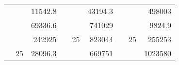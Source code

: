 \begin{table}[H]
\begin{tabular}{|ccrccrccc}
\rowcolor[HTML]{DAE8FC} 
\multicolumn{1}{|c|}{\cellcolor[HTML]{FFFFC7}}                                & \multicolumn{1}{c|}{\cellcolor[HTML]{DAE8FC}}                      & \multicolumn{1}{r|}{\cellcolor[HTML]{DAE8FC}11542.8}   & \multicolumn{1}{c|}{\cellcolor[HTML]{FFFFC7}}                                & \multicolumn{1}{c|}{\cellcolor[HTML]{DAE8FC}}                       & \multicolumn{1}{r|}{\cellcolor[HTML]{DAE8FC}43194.3}   & \multicolumn{1}{c|}{\cellcolor[HTML]{FFFFC7}}                                & \multicolumn{1}{c|}{\cellcolor[HTML]{DAE8FC}}                      & \multicolumn{1}{r|}{\cellcolor[HTML]{DAE8FC}498003}    \\ \cline{3-3} \cline{6-6} \cline{9-9} 
\multicolumn{1}{|c|}{\cellcolor[HTML]{FFFFC7}}                                & \multicolumn{1}{c|}{\cellcolor[HTML]{DAE8FC}}                      & \multicolumn{1}{r|}{\cellcolor[HTML]{DDFDFF}69336.6}   & \multicolumn{1}{c|}{\cellcolor[HTML]{FFFFC7}}                                & \multicolumn{1}{c|}{\cellcolor[HTML]{DAE8FC}}                       & \multicolumn{1}{r|}{\cellcolor[HTML]{DDFDFF}741029}    & \multicolumn{1}{c|}{\cellcolor[HTML]{FFFFC7}}                                & \multicolumn{1}{c|}{\cellcolor[HTML]{DAE8FC}}                      & \multicolumn{1}{r|}{\cellcolor[HTML]{DDFDFF}9824.9}    \\ \cline{3-3} \cline{6-6} \cline{9-9} 
\rowcolor[HTML]{DAE8FC} 
\multicolumn{1}{|c|}{\cellcolor[HTML]{FFFFC7}}                                & \multicolumn{1}{c|}{\cellcolor[HTML]{DAE8FC}}                      & \multicolumn{1}{r|}{\cellcolor[HTML]{DAE8FC}242925}    & \multicolumn{1}{c|}{\cellcolor[HTML]{FFFFC7}}                                & \multicolumn{1}{c|}{\multirow{-9}{*}{\cellcolor[HTML]{DAE8FC}25}}   & \multicolumn{1}{r|}{\cellcolor[HTML]{DAE8FC}823044}    & \multicolumn{1}{c|}{\cellcolor[HTML]{FFFFC7}}                                & \multicolumn{1}{c|}{\multirow{-9}{*}{\cellcolor[HTML]{DAE8FC}25}}  & \multicolumn{1}{r|}{\cellcolor[HTML]{DAE8FC}255253}    \\ \cline{3-3} \cline{5-6} \cline{8-9} 
\multicolumn{1}{|c|}{\cellcolor[HTML]{FFFFC7}}                                & \multicolumn{1}{c|}{\multirow{-10}{*}{\cellcolor[HTML]{DAE8FC}25}} & \multicolumn{1}{r|}{\cellcolor[HTML]{DDFDFF}28096.3}   & \multicolumn{1}{c|}{\cellcolor[HTML]{FFFFC7}}                                & \multicolumn{1}{c|}{\cellcolor[HTML]{DDFDFF}}                       & \multicolumn{1}{r|}{\cellcolor[HTML]{DAE8FC}669751}    & \multicolumn{1}{c|}{\cellcolor[HTML]{FFFFC7}}                                & \multicolumn{1}{c|}{\cellcolor[HTML]{DDFDFF}}                      & \multicolumn{1}{r|}{\cellcolor[HTML]{DAE8FC}1023580}   \\ \cline{2-3} \cline{6-6} \cline{9-9} 

\end{tabular}
\end{table}
